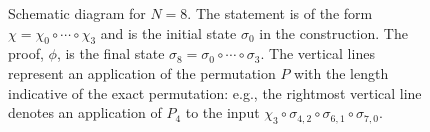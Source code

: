 \documentclass[a4paper,12pt]{article}
\begin{document}
\begin{figure}
      \caption{Schematic diagram for $N=8$. The statement is of the form $\chi=\chi_0\circ\cdots\circ\chi_3$ and is the initial state $\sigma_0$ in the construction. The proof, $\phi$, is the final state $\sigma_8=\sigma_0\circ\cdots\circ\sigma_3$. The vertical lines represent an application of the permutation $P$ with the length indicative of the exact permutation: e.g., the rightmost vertical line denotes an application of $P_4$ to the input $\chi_3\circ\sigma_{4,2}\circ\sigma_{6,1}\circ\sigma_{7,0}$.}
    \end{figure}
\end{document}
